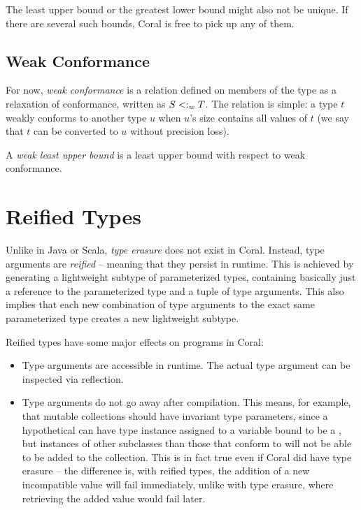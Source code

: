 The least upper bound or the greatest lower bound might also not be unique. If there are several such bounds, Coral is free to pick up any of them. 





\subsection{Weak Conformance}
\label{sec:weak-conformance}

For now, {\em weak conformance} is a relation defined on members of the  type as a relaxation of conformance, written as $S <: _w T$. The relation is simple: a type $t$ weakly conforms to another type $u$ when $u$'s size contains all values of $t$ (we say that $t$ can be converted to $u$ without precision loss). 

A {\em weak least upper bound} is a least upper bound with respect to weak conformance. 





\section{Reified Types}
\label{sec:reified-types}

Unlike in Java or Scala, {\em type erasure} does not exist in Coral. Instead, type arguments are {\em reified} -- meaning that they persist in runtime. This is achieved by generating a lightweight subtype of parameterized types, containing basically just a reference to the parameterized type and a tuple of type arguments. This also implies that each new combination of type arguments to the exact same parameterized type creates a new lightweight subtype.

Reified types have some major effects on programs in Coral:
\begin{itemize}

\item Type arguments are accessible in runtime. The actual type argument can be inspected via reflection. 

\item Type arguments do not go away after compilation. This means, for example, that mutable collections should have invariant type parameters, since a hypothetical  can have type instance  assigned to a variable bound to be a , but instances of other subclasses than those that conform to  will not be able to be added to the collection. This is in fact true even if Coral did have type erasure -- the difference is, with reified types, the addition of a new incompatible value will fail immediately, unlike with type erasure, where retrieving the added value would fail later. 
\end{itemize}









